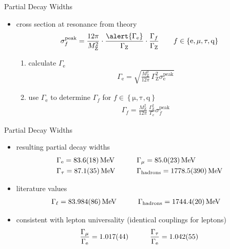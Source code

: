 \documentclass[11pt,xcolor=dvipsnames,professionalfonts]{beamer}
\begin{document}
\begin{frame}{Partial Decay Widths}
	\begin{itemize}
		\item cross section at resonance from theory
			\begin{align*}
			\sigma_f^\mathrm{peak} = \frac{12 \pi}{M_\mathrm{Z}^2} \cdot \frac{\alert{\Gamma_\mathrm{e}}}{\Gamma_\mathrm{Z}} \cdot \frac{\Gamma_f}{\Gamma_\mathrm{Z}} \qquad f \in \left\{ \mathrm{e}, \mathrm{\mu}, \mathrm{\tau}, \mathrm{q} \right\}
			\end{align*}
		
		\begin{enumerate}
			\item<2-> calculate $\Gamma_\mathrm{e}$
				 \begin{align*}
				 	\Gamma_\mathrm{e} = \sqrt{\frac{M_\mathrm{Z}^2}{12 \pi} \, \Gamma_\mathrm{Z}^2 \sigma_\mathrm{e}^\mathrm{peak}}
				 \end{align*}
				 
			\item<3-> use $\Gamma_\mathrm{e}$ to determine $\Gamma_f$ for $f \in \left\{ \mathrm{\mu}, \mathrm{\tau}, \mathrm{q} \right\}$
				\begin{align*}
					\Gamma_f = \frac{M_\mathrm{Z}^2}{12 \pi } \, \frac{\Gamma_\mathrm{Z}^2 }{\Gamma_\mathrm{e}} \sigma_f^\mathrm{peak}
				\end{align*}
		\end{enumerate}
	\end{itemize}	
\end{frame}

\begin{frame}{Partial Decay Widths}
	\begin{itemize}
		\setlength\itemsep{2em}
		\item resulting partial decay widths
			\begin{alignat*}{2}
			&\Gamma_\mathrm{e} = \SI{83.6 +- 1.8}{MeV} \qquad
			&&\Gamma_\mathrm{\mu} = \SI{85.0 +- 2.3}{MeV}\\
			&\Gamma_\mathrm{\tau} = \SI{87.1 +- 3.5}{MeV}\qquad
			&&\Gamma_\mathrm{hadrons} = \SI{1778.5 +- 39}{MeV}
			\end{alignat*}
		
		\item<2-> literature values \cite{pdg}
		\begin{alignat*}{2}
		&\Gamma_\ell = \SI{83.984 +- 0.086}{MeV} \qquad
		&&\Gamma_\mathrm{hadrons} = \SI{1744.4 +- 2.0}{MeV}
		\end{alignat*}
		
		\item<3-> consistent with lepton universality (identical couplings for leptons)
			\begin{align*}
				&\frac{\Gamma_\mathrm{\mu}}{\Gamma_\mathrm{e}} = \num{1.017 +- 0.044} \qquad 
				&\frac{\Gamma_\mathrm{\tau}}{\Gamma_\mathrm{e}} = \num{1.042 +- 0.055}
			\end{align*}
	\end{itemize}
\end{frame}
\end{document}
